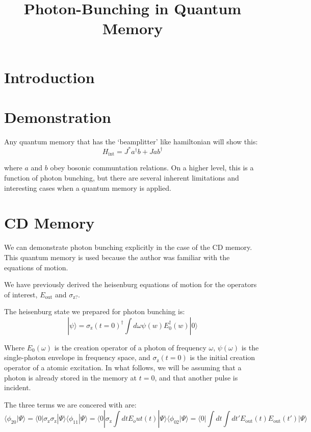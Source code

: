 \documentclass[12pt]{article}
\title{Photon-Bunching in Quantum Memory}
\begin{document}

\maketitle
\section{Introduction}

\section{Demonstration}

Any quantum memory that has the `beamplitter' like hamiltonian will show this:
\begin{equation}
H_{\textrm{int}}= J^* a^\dagger b + J a b^\dagger
\end{equation}

where $a$ and $b$ obey bosonic communtation relations. On a higher level, this is a function of photon bunching, but there are several inherent limitations and interesting cases when a quantum memory is applied.

\section{CD Memory}
We can demonstrate photon bunching explicitly in the case of the CD memory\cite{arxiv}. This quantum memory is used because the author was familiar with the equations of motion.

We have previously derived the heisenburg equations of motion for the operators of interest, $E_{\textrm{out}}$ and $\sigma_{\textrm{z?}}$.

The heisenburg state we prepared for photon bunching is:
\begin{equation}
| \psi \rangle = \sigma_\textrm{z}(t=0)^\dagger \int d\omega \psi(w) E_0^\dagger(w) | 0 \rangle
\end{equation}

Where $E_0(\omega)$ is the creation operator of a photon of frequency $\omega$, $\psi(\omega)$ is the single-photon envelope in frequency space, and $\sigma_\textrm{z}(t=0)$ is the initial creation operator of a atomic excitation. In what follows, we will be assuming that a photon is already stored in the memory at $t=0$, and that another pulse is incident.

The three terms we are concered with are:
\begin{equation}
\langle \phi_{20}| \Psi \rangle =\langle 0 | \sigma_\textrm{z} \sigma_\textrm{z} | \Psi \rangle
\langle \phi_{11} | \Psi \rangle =\langle 0 | \sigma_\textrm{z} \int dt E_out(t) | \Psi \rangle
\langle \phi_{02} | \Psi \rangle = \langle 0 | \int dt \int dt' E_\textrm{out}(t) E_\textrm{out}(t') | \Psi \rangle
\end{equation}
\end{document}
